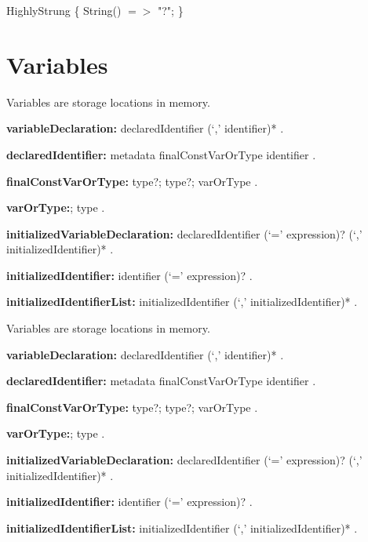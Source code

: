 \documentclass{article}
\begin{document}
\begin{dartCode}
\CLASS{} HighlyStrung \{
  String() $=>$ "?";
\}
\end{dartCode}

\section{Variables}


\LMHash{}
Variables are storage locations in memory.

\begin{grammar}
{\bf variableDeclaration:}
      declaredIdentifier (`,' identifier)*
      .

{\bf declaredIdentifier:}
      metadata finalConstVarOrType identifier
    .

{\bf finalConstVarOrType:}\FINAL{} type?;
           \CONST{} type?;
	varOrType
    .

 {\bf varOrType:}\VAR{};
	type
    .

 {\bf initializedVariableDeclaration:}
      declaredIdentifier (`=' expression)? (`,' initializedIdentifier)* %
    .

{\bf initializedIdentifier:}
      identifier (`=' expression)? %
    .

{\bf initializedIdentifierList:}
      initializedIdentifier (`,' initializedIdentifier)*
    .




  \end{grammar}

\LMHash{}
Variables are storage locations in memory.

\begin{grammar}
  {\bf variableDeclaration:} declaredIdentifier (`,' identifier)* .

  {\bf declaredIdentifier:} metadata finalConstVarOrType identifier .

  {\bf finalConstVarOrType:}\FINAL{} type?; \CONST{} type?; varOrType .

  {\bf varOrType:}\VAR{}; type .

  {\bf initializedVariableDeclaration:} declaredIdentifier (`=' expression)? (`,' initializedIdentifier)* .

  {\bf initializedIdentifier:} identifier (`=' expression)? .

  {\bf initializedIdentifierList:} initializedIdentifier (`,' initializedIdentifier)* .
\end{grammar}
\end{document}
